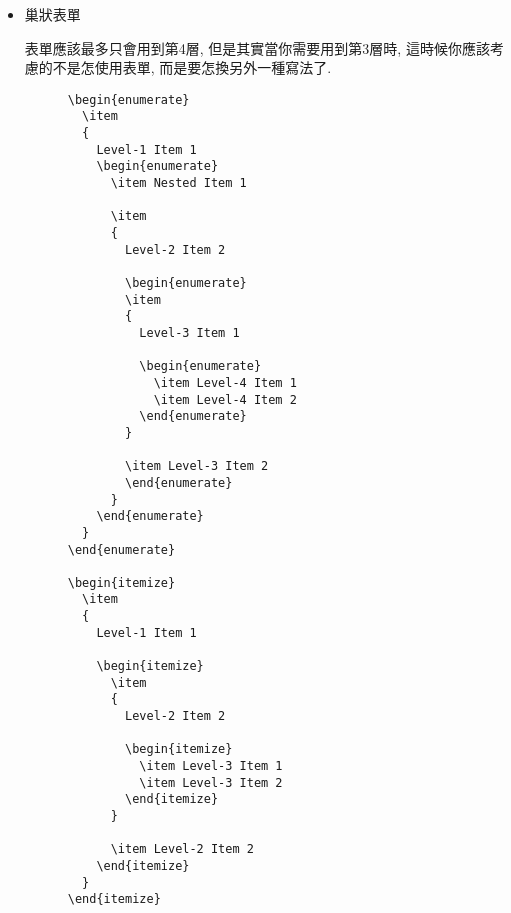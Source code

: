 \begin{itemize}
  \newpage
  \item
  {
    巢狀表單

    表單應該最多只會用到第4層, 但是其實當你需要用到第3層時, 這時候你應該考慮的不是怎使用表單, 而是要怎換另外一種寫法了.

    \begin{framed}
    \begin{verbatim}
      \begin{enumerate}
        \item
        {
          Level-1 Item 1
          \begin{enumerate}
            \item Nested Item 1

            \item
            {
              Level-2 Item 2

              \begin{enumerate}
              \item
              {
                Level-3 Item 1

                \begin{enumerate}
                  \item Level-4 Item 1
                  \item Level-4 Item 2
                \end{enumerate}
              }

              \item Level-3 Item 2
              \end{enumerate}
            }
          \end{enumerate}
        }
      \end{enumerate}

      \begin{itemize}
        \item
        {
          Level-1 Item 1

          \begin{itemize}
            \item
            {
              Level-2 Item 2

              \begin{itemize}
                \item Level-3 Item 1
                \item Level-3 Item 2
              \end{itemize}
            }

            \item Level-2 Item 2
          \end{itemize}
        }
      \end{itemize}
    \end{verbatim}
    \end{framed}

}
\end{itemize}
